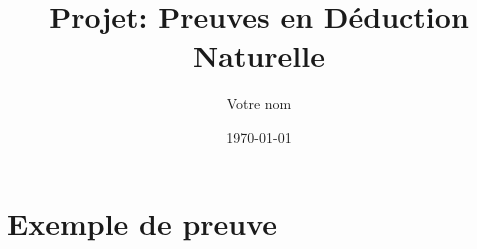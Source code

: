 \documentclass{article}[11pt]
\title{Projet: Preuves en Déduction Naturelle}
\author{Votre nom}
\date{\today}
\begin{document}
\maketitle

\section{Exemple de preuve}

\end{document}
